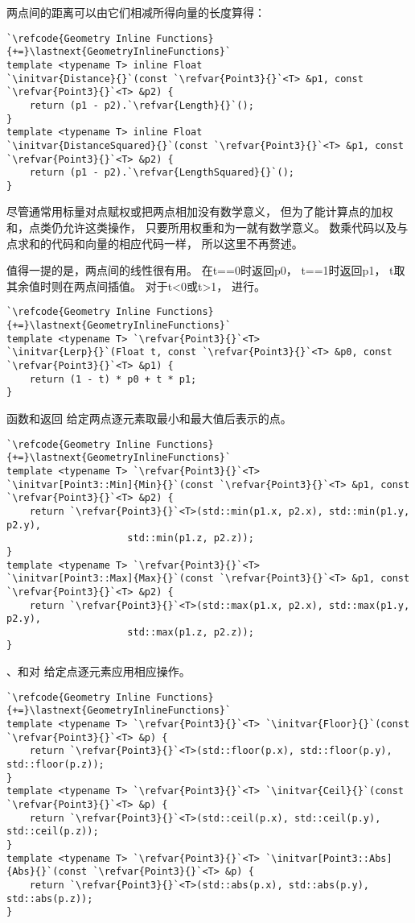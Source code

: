 两点间的距离可以由它们相减所得向量的长度算得：
\begin{lstlisting}
`\refcode{Geometry Inline Functions}{+=}\lastnext{GeometryInlineFunctions}`
template <typename T> inline Float
`\initvar{Distance}{}`(const `\refvar{Point3}{}`<T> &p1, const `\refvar{Point3}{}`<T> &p2) {
    return (p1 - p2).`\refvar{Length}{}`();
}
template <typename T> inline Float
`\initvar{DistanceSquared}{}`(const `\refvar{Point3}{}`<T> &p1, const `\refvar{Point3}{}`<T> &p2) {
    return (p1 - p2).`\refvar{LengthSquared}{}`();
}
\end{lstlisting}

尽管通常用标量对点赋权或把两点相加没有数学意义，
但为了能计算点的加权和，点类仍允许这类操作，
只要所用权重和为一就有数学意义。
数乘代码以及与点求和的代码和向量的相应代码一样，
所以这里不再赘述。

值得一提的是，两点间的线性很有用。
在{\ttfamily t==0}时返回{\ttfamily p0}，
{\ttfamily t==1}时返回{\ttfamily p1}，
{\ttfamily t}取其余值时则在两点间插值。
对于{\ttfamily t<0}或{\ttfamily t>1}，
进行。
\begin{lstlisting}
`\refcode{Geometry Inline Functions}{+=}\lastnext{GeometryInlineFunctions}`
template <typename T> `\refvar{Point3}{}`<T>
`\initvar{Lerp}{}`(Float t, const `\refvar{Point3}{}`<T> &p0, const `\refvar{Point3}{}`<T> &p1) {
    return (1 - t) * p0 + t * p1;
}
\end{lstlisting}

函数和返回
给定两点逐元素取最小和最大值后表示的点。
\begin{lstlisting}
`\refcode{Geometry Inline Functions}{+=}\lastnext{GeometryInlineFunctions}`
template <typename T> `\refvar{Point3}{}`<T>
`\initvar[Point3::Min]{Min}{}`(const `\refvar{Point3}{}`<T> &p1, const `\refvar{Point3}{}`<T> &p2) {
    return `\refvar{Point3}{}`<T>(std::min(p1.x, p2.x), std::min(p1.y, p2.y), 
                     std::min(p1.z, p2.z));
}
template <typename T> `\refvar{Point3}{}`<T>
`\initvar[Point3::Max]{Max}{}`(const `\refvar{Point3}{}`<T> &p1, const `\refvar{Point3}{}`<T> &p2) {
    return `\refvar{Point3}{}`<T>(std::max(p1.x, p2.x), std::max(p1.y, p2.y), 
                     std::max(p1.z, p2.z));
}
\end{lstlisting}

、和对
给定点逐元素应用相应操作。
\begin{lstlisting}
`\refcode{Geometry Inline Functions}{+=}\lastnext{GeometryInlineFunctions}`
template <typename T> `\refvar{Point3}{}`<T> `\initvar{Floor}{}`(const `\refvar{Point3}{}`<T> &p) {
    return `\refvar{Point3}{}`<T>(std::floor(p.x), std::floor(p.y), std::floor(p.z));
}
template <typename T> `\refvar{Point3}{}`<T> `\initvar{Ceil}{}`(const `\refvar{Point3}{}`<T> &p) {
    return `\refvar{Point3}{}`<T>(std::ceil(p.x), std::ceil(p.y), std::ceil(p.z));
}
template <typename T> `\refvar{Point3}{}`<T> `\initvar[Point3::Abs]{Abs}{}`(const `\refvar{Point3}{}`<T> &p) {
    return `\refvar{Point3}{}`<T>(std::abs(p.x), std::abs(p.y), std::abs(p.z));
}
\end{lstlisting}

